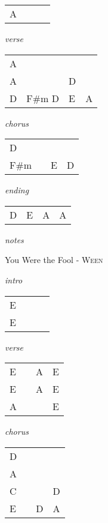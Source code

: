 \documentclass[12pt]{article}
\begin{document}
\begin{tabular}{|P{1.25in}|P{1.25in}|P{1.25in}|P{1.25in}|}
  A &  &  &  \\
\end{tabular}

\textit{verse}

\begin{tabular}{|P{1.25in}|P{1.25in}|P{1.25in}|P{1.25in}|}
  A &  &  &  \\
  A &  &  D  \\
  D & F\#m D & E & A \\
\end{tabular}

\textit{chorus}

\begin{tabular}{|P{1.25in}|P{1.25in}|P{1.25in}|P{1.25in}|}
  D &   &   &   \\
  F\#m &   &  E  &  D \\
\end{tabular}

\textit{ending}

\begin{tabular}{|P{1.25in}|P{1.25in}|P{1.25in}|P{1.25in}|}
  D & E & A & A \\
\end{tabular}

\textit{notes}



\newpage

{\Huge You Were the Fool} {\huge - \textsc{Ween}}

\huge
\textit{intro}

\begin{tabular}{|P{1.25in}|P{1.25in}|P{1.25in}|P{1.25in}|}
  E &   &   &   \\
  E &   &   &   \\
\end{tabular}

\textit{verse}

\begin{tabular}{|P{1.25in}|P{1.25in}|P{1.25in}|P{1.25in}|}
  E &   & A  &  E \\
  E &   & A  &  E \\
  A &   &   & E  \\
\end{tabular}

\textit{chorus}

\begin{tabular}{|P{1.25in}|P{1.25in}|P{1.25in}|P{1.25in}|}
  D &   &   &   \\
  A &   &   &   \\
  C &   &   & D  \\
  E &   &  D &  A \\
\end{tabular}
\end{document}
